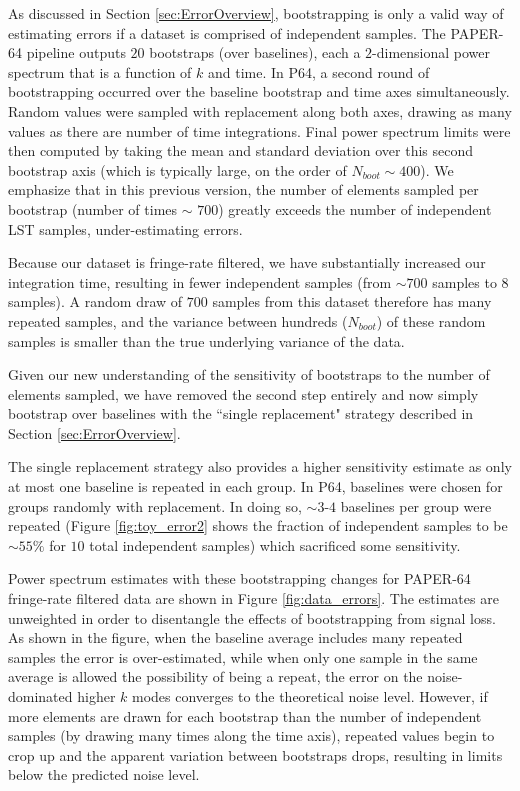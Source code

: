 \documentclass[preprint2,numberedappendix,tighten]{aastex6}  %
\begin{document}
As discussed in Section \ref{sec:ErrorOverview}, bootstrapping is only a valid way of estimating errors if a dataset is comprised of independent samples. The PAPER-64 pipeline outputs $20$ bootstraps (over baselines), each a $2$-dimensional power spectrum that is a function of $k$ and time. In P64, a second round of bootstrapping occurred over the baseline bootstrap and time axes simultaneously. Random values were sampled with replacement along both axes, drawing as many values as there are number of time integrations. Final power spectrum limits were then computed by taking the mean and standard deviation over this second bootstrap axis (which is typically large, on the order of $N_{boot} \sim 400$). We emphasize that in this previous version, the number of elements sampled per bootstrap (number of times $\sim$ $700$) greatly exceeds the number of independent LST samples, under-estimating errors.

Because our dataset is fringe-rate filtered, we have substantially increased our integration time, resulting in fewer independent samples (from $\sim700$ samples to $8$ samples). A random draw of $700$ samples from this dataset therefore has many repeated samples, and the variance between hundreds ($N_{boot}$) of these random samples is smaller than the true underlying variance of the data. 

Given our new understanding of the sensitivity of bootstraps to the number of elements sampled, we have removed the second step entirely and now simply bootstrap over baselines with the ``single replacement" strategy described in Section \ref{sec:ErrorOverview}.

The single replacement strategy also provides a higher sensitivity estimate as only at most one baseline is repeated in each group. In P64, baselines were chosen for groups randomly with replacement. In doing so, $\sim$$3$-$4$ baselines per group were repeated (Figure \ref{fig:toy_error2} shows the fraction of independent samples to be $\sim$$55\%$ for $10$ total independent samples) which sacrificed some sensitivity. 

Power spectrum estimates with these bootstrapping changes for PAPER-64 fringe-rate filtered data are shown in Figure \ref{fig:data_errors}. The estimates are unweighted in order to disentangle the effects of bootstrapping from signal loss. As shown in the figure, when the baseline average includes many repeated samples the error is over-estimated, while when only one sample in the same average is allowed the possibility of being a repeat, the error on the noise-dominated higher $k$ modes converges to the theoretical noise level.  However, if more elements are drawn for each bootstrap than the number of independent samples (by drawing many times along the time axis), repeated values begin to crop up and the apparent variation between bootstraps drops, resulting in limits below the predicted noise level.
\end{document}
